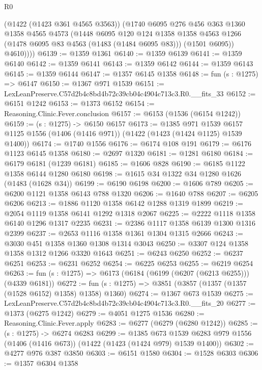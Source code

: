 \begin{lexlean}{R0}
\begin{coremodule}
          (@1422 (@1423 @361 @4565 @3563))
          (@1740
            @6095
            @276
            @456
            @363
            @1360
            @1358
            @4565
            @4573
            (@1448
              @6095
              @120
              @124
              @1358
              @1358
              @4563
              @1266
              (@1478 @6095 @83 @4563 (@1483 (@1484 @6095 @83)))
              (@1501 @6095))
            @4610))))
@6139 := @1359 @1361
@6140 := @1359 @6139
@6141 := @1359 @6140
@6142 := @1359 @6141
@6143 := @1359 @6142
@6144 := @1359 @6143
@6145 := @1359 @6144
@6147 := @1357 @6145 @1358
@6148 := fun (s : @1275) => @6147
@6150 := @1367 @971 @1539
@6151 := LexLeanPreserve.C57d2b4c8bd4b72c39cb04c4904c713c3.R0.__fits_33
@6152 := @6151 @1242
@6153 := @1373 @6152
@6154 := Reasoning.Clinic.Fever.conclusion
@6157 := @6153 (@1536 (@6154 @1242))
@6159 := (s : @1275) -> @6150 @6157
@6173 := @1385
    @971
    @1539
    @6157
    @1125
    @1556
    (@1406 (@1416 @971))
    (@1422 (@1423 (@1424 @1125) @1539 @1400))
@6174 := @1740 @1556
@6176 := @6174 @108 @191
@6179 := @6176 @1123 @6145 @1358
@6180 := @2697 @1320
@6181 := @1281 @6180
@6184 := @6179 @6181 (@1239 @6181)
@6185 := @1606 @828
@6190 := @6185 @1122 @1358 @6144 @1280 @6180
@6198 := @1615 @34 @1322 @34 @1280 @1626 (@1483 (@1628 @34))
@6199 := @6190 @6198
@6200 := @1606 @789
@6205 := @6200 @1121 @1358 @6143 @788 @1320
@6206 := @1640 @788
@6207 := @6205 @6206
@6213 := @1886 @1120 @1358 @6142 @1288 @1319 @1899
@6219 := @2054 @1119 @1358 @6141 @1292 @1318 @2067
@6225 := @2222 @1118 @1358 @6140 @1296 @1317 @2235
@6231 := @2386 @1117 @1358 @6139 @1300 @1316 @2399
@6237 := @2653 @1116 @1358 @1361 @1304 @1315 @2666
@6243 := @3030 @451 @1358 @1360 @1308 @1314 @3043
@6250 := @3307 @124 @1358 @1358 @1312 @1266 @3320 @1643
@6251 := @6243 @6250
@6252 := @6237 @6251
@6253 := @6231 @6252
@6254 := @6225 @6253
@6255 := @6219 @6254
@6263 := fun (s : @1275) => @6173 (@6184 (@6199 (@6207 (@6213 @6255))) (@4339 @6181))
@6272 := fun (s : @1275) => @3851 (@3857 (@1357 (@1357 (@1528 @6152) @1358) @1358) @1360)
@6274 := @1367 @673 @1539
@6275 := LexLeanPreserve.C57d2b4c8bd4b72c39cb04c4904c713c3.R0.__fits_20
@6277 := @1373 (@6275 @1242)
@6279 := @4051 @1275 @1536
@6280 := Reasoning.Clinic.Fever.apply
@6283 := @6277 (@6279 (@6280 @1242))
@6285 := (s : @1275) -> @6274 @6283
@6299 := @1385
    @673
    @1539
    @6283
    @979
    @1556
    (@1406 (@1416 @673))
    (@1422 (@1423 (@1424 @979) @1539 @1400))
@6302 := @4277 @976 @387 @3850
@6303 := @6151 @1580
@6304 := @1528 @6303
@6306 := @1357 @6304 @1358

\end{coremodule}
\end{lexlean}
